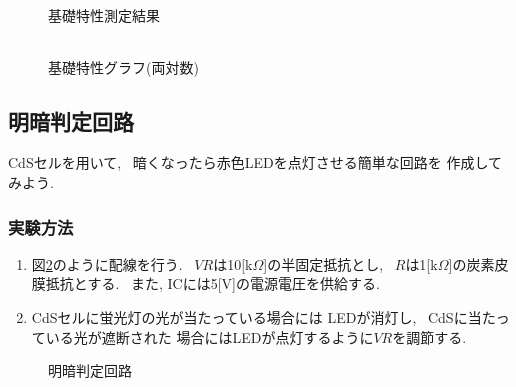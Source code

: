 \documentclass[titlepage]{jsarticle}
\begin{document}
            \begin{figure}[ht]
                \def\@captype{table}
                \begin{minipage}{0.5\hsize}
                    \begin{center}
                        \caption{基礎特性測定結果}
                        \label{tab:kisotokuseikekka}
                        \begin{tabular}{c|c}
                            
                        \end{tabular}
                    \end{center}
                \end{minipage}
                \begin{minipage}{0.5\hsize}
                    \begin{center}
                        \caption{基礎特性グラフ(両対数)}
                        \label{fig:kisotokuseigraph}
                    \end{center}
                \end{minipage}
            \end{figure}

    \subsection{明暗判定回路}
        CdSセルを用いて, ~暗くなったら赤色LEDを点灯させる簡単な回路を
        作成してみよう.

        \subsubsection{実験方法}
            \begin{enumerate}
                \item 図\ref{fig:hanteikairo}のように配線を行う.
                    ~$VR$は10[k$\Omega$]の半固定抵抗とし,
                    ~$R$は1[k$\Omega$]の炭素皮膜抵抗とする.
                    ~また, ICには5[V]の電源電圧を供給する.
                \item CdSセルに蛍光灯の光が当たっている場合には
                    LEDが消灯し, ~CdSに当たっている光が遮断された
                    場合にはLEDが点灯するように$VR$を調節する.
            \end{enumerate}

            \begin{figure}[ht]
                \centering
                \caption{明暗判定回路}
                \label{fig:hanteikairo}
            \end{figure}
\end{document}
